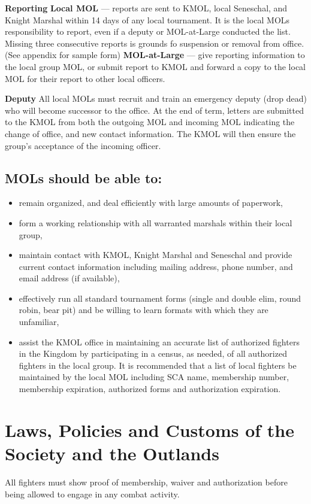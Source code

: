\documentclass{article}
\begin{document}
\textbf{Reporting} \textbf{Local MOL} --- reports are sent to KMOL, local Seneschal, and Knight Marshal within 14
days of any local tournament. It is the local MOLs responsibility to report, even if a deputy
or MOL-at-Large conducted the list. Missing three consecutive reports is grounds fo
suspension or removal from office. (See appendix for sample form)
\textbf{MOL-at-Large} --- give reporting information to the local group MOL, or submit report to
KMOL and forward a copy to the local MOL for their report to other local officers.

\textbf{Deputy} All local MOLs must recruit and train an emergency deputy (drop dead) who will become
successor to the office. At the end of term, letters are submitted to the KMOL from both
the outgoing MOL and incoming MOL indicating the change of office, and new contact
information. The KMOL will then ensure the group’s acceptance of the incoming officer.


\subsection*{MOLs should be able to:}
\begin{itemize}
\item remain organized, and deal efficiently with large amounts of paperwork,
\item form a working relationship with all warranted marshals within their local group,
\item maintain contact with KMOL, Knight Marshal and Seneschal and provide current contact
information including mailing address, phone number, and email address (if available),
\item effectively run all standard tournament forms (single and double elim, round robin, bear pit) and
be willing to learn formats with which they are unfamiliar,
\item assist the KMOL office in maintaining an accurate list of authorized fighters in the Kingdom by
participating in a census, as needed, of all authorized fighters in the local group. It is
recommended that a list of local fighters be maintained by the local MOL including SCA name,
membership number, membership expiration, authorized forms and authorization expiration.
\end{itemize}

\section{Laws, Policies and Customs of the Society and the Outlands}
All fighters must show proof of membership, waiver and authorization
before being allowed to engage in any combat activity.
\end{document}
